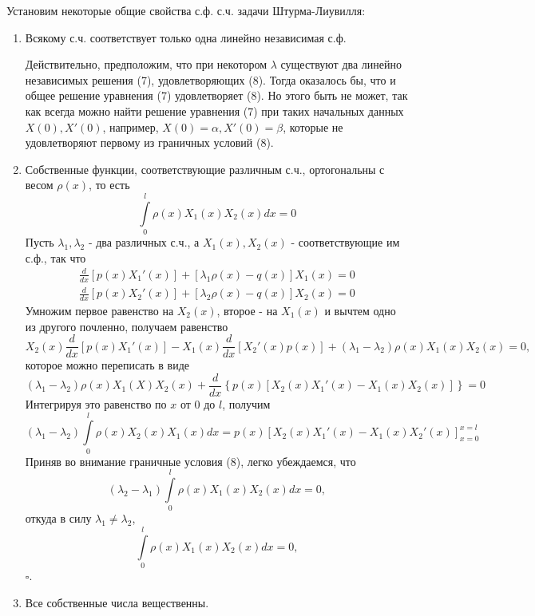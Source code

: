 Установим некоторые общие свойства с.ф. с.ч. задачи Штурма-Лиувилля:
\begin{enumerate}
	\item{Всякому с.ч. соответствует только одна линейно независимая с.ф.

			Действительно, предположим, что при некотором $\lambda$ существуют два линейно независимых решения (7), удовлетворяющих (8). Тогда оказалось бы, что и общее решение уравнения (7) удовлетворяет (8). Но этого быть не может, так как всегда можно найти решение уравнения (7) при таких начальных данных $X(0), X'(0)$, например, $X(0)=\alpha, X'(0)=\beta$, которые не удовлетворяют первому из граничных условий (8).
		}
		\item{Собственные функции, соответствующие различным с.ч., ортогональны с весом $\rho(x)$, то есть
				\[
					\int\limits_0^l \rho(x) X_1 (x) X_2 (x) dx = 0 \tag{10}
				\]
			Пусть $\lambda_1, \lambda_2$ - два различных с.ч., а $X_1(x), X_2(x)$ - соответствующие им с.ф., так что
			\[
				\begin{aligned}
					\frac{d}{dx} \left[ p(x) X_1'(x)\right] + \left[ \lambda_1 \rho(x) - q(x)\right]X_1(x) = 0 \\
					\frac{d}{dx} \left[ p(x) X_2'(x)\right] + \left[ \lambda_2 \rho(x) - q(x)\right]X_2 (x) = 0
				\end{aligned}
			\]
			Умножим первое равенство на $X_2(x)$, второе - на $X_1(x)$ и вычтем одно из другого почленно, получаем равенство
			\[
				X_2(x) \frac{d}{dx} \left[ p(x) X_1'(x)\right] - X_1 (x) \frac{d}{dx} \left[ X_2'(x) p(x)\right] + (\lambda_1 - \lambda_2) \rho(x) X_1 (x) X_2 (x) = 0,
			\]
			которое можно переписать в виде
			\[
				(\lambda_1 - \lambda_2) \rho(x) X_1 (X) X_2 (x) + \frac{d}{dx} \left\{ p(x) \left[ X_2(x) X_1'(x) - X_1 (x) X_2 (x)\right]\right\} = 0
			\]
			Интегрируя это равенство по $x$ от $0$ до $l$, получим
			\[
				(\lambda_1 - \lambda_2) \int\limits_0^l \rho(x) X_2 (x) X_1 (x) dx = p(x) \left[ X_2 (x) X_1' (x) - X_1 (x) X_2' (x)\right]_{x=0}^{x=l}
			\]
			Приняв во внимание граничные условия (8), легко убеждаемся, что
			\[
				(\lambda_2 - \lambda_1) \int\limits_0^l \rho(x) X_1 (x) X_2 (x) dx = 0,
			\]
			откуда в силу $\lambda_1 \ne \lambda_2$,
			\[
				\int\limits_0^l \rho(x) X_1 (x) X_2 (x) dx = 0,
			\]
			$\square$.
			}
			\item{Все собственные числа вещественны.

}
\end{enumerate}

